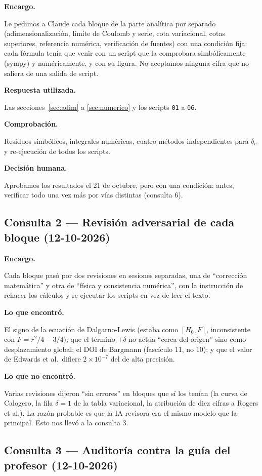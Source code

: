\documentclass[11pt]{article}
\newcommand{\dc}{\delta_c}
\newcommand{\campo}[1]{\par\smallskip\textbf{#1}\par}
\begin{document}
\campo{Encargo.} Le pedimos a Claude cada bloque de la parte analítica por separado (adimensionalización, límite de Coulomb y serie, cota variacional, cotas superiores, referencia numérica, verificación de fuentes) con una condición fija: cada fórmula tenía que venir con un script que la comprobara simbólicamente (sympy) y numéricamente, y con su figura. No aceptamos ninguna cifra que no saliera de una salida de script.

\campo{Respuesta utilizada.} Las secciones~\ref{sec:adim} a \ref{sec:numerico} y los scripts \texttt{01} a \texttt{06}.

\campo{Comprobación.} Residuos simbólicos, integrales numéricas, cuatro métodos independientes para $\dc$ y re-ejecución de todos los scripts.

\campo{Decisión humana.} Aprobamos los resultados el 21 de octubre, pero con una condición: antes, verificar todo una vez más por vías distintas (consulta 6).

\subsection*{Consulta 2 --- Revisión adversarial de cada bloque (12-10-2026)}

\campo{Encargo.} Cada bloque pasó por dos revisiones en sesiones separadas, una de ``corrección matemática'' y otra de ``física y consistencia numérica'', con la instrucción de rehacer los cálculos y re-ejecutar los scripts en vez de leer el texto.

\campo{Lo que encontró.} El signo de la ecuación de Dalgarno-Lewis (estaba como $[H_0,F]$, inconsistente con $F=r^2/4-3/4$); que el término $+\delta$ no actúa ``cerca del origen'' sino como desplazamiento global; el DOI de Bargmann (fascículo 11, no 10); y que el valor de Edwards et al.\ difiere $2\times10^{-7}$ del de alta precisión.

\campo{Lo que no encontró.} Varias revisiones dijeron ``sin errores'' en bloques que sí los tenían (la curva de Calogero, la fila $\delta=1$ de la tabla variacional, la atribución de diez cifras a Rogers et al.). La razón probable es que la IA revisora era el mismo modelo que la principal. Esto nos llevó a la consulta 3.

\subsection*{Consulta 3 --- Auditoría contra la guía del profesor (12-10-2026)}
\end{document}

